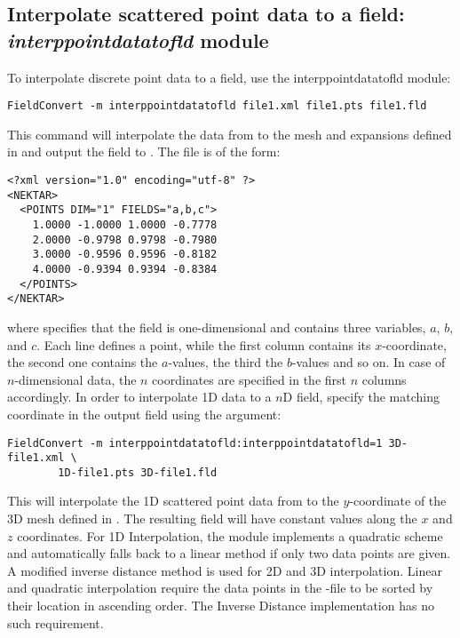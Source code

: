 \subsection{Interpolate scattered point data to a field: \textit{interppointdatatofld} module}
\label{s:utilities:fieldconvert:sub:interppointdatatofld}
To interpolate discrete point data to a field, use the interppointdatatofld module:
%
\begin{lstlisting}[style=BashInputStyle]
FieldConvert -m interppointdatatofld file1.xml file1.pts file1.fld
\end{lstlisting}
%
This command will interpolate the data from  to the mesh
and expansions defined in  and output the field to .
The file  is of the form:
%
\begin{lstlisting}[style=XMLStyle]
<?xml version="1.0" encoding="utf-8" ?>
<NEKTAR>
  <POINTS DIM="1" FIELDS="a,b,c">
    1.0000 -1.0000 1.0000 -0.7778
    2.0000 -0.9798 0.9798 -0.7980
    3.0000 -0.9596 0.9596 -0.8182
    4.0000 -0.9394 0.9394 -0.8384
  </POINTS>
</NEKTAR>
\end{lstlisting}
%
where  specifies that the field is one-dimensional
and contains three variables, $a$, $b$, and $c$.
Each line defines a point, while the  first column contains its $x$-coordinate,
the second one contains the $a$-values, the third the $b$-values and so on.
In case of $n$-dimensional data, the $n$ coordinates are specified in the first $n$
columns accordingly.
%
In order to interpolate 1D data to a $n$D field, specify the matching coordinate in
the output field using the  argument:
%
\begin{lstlisting}[style=BashInputStyle]
FieldConvert -m interppointdatatofld:interppointdatatofld=1 3D-file1.xml \
		1D-file1.pts 3D-file1.fld
\end{lstlisting}
%
This will interpolate the 1D scattered point data from  to the
$y$-coordinate of the 3D mesh defined in \inltt{3D-file1.xml}. The resulting field
will have constant values along the $x$ and $z$ coordinates.
For 1D Interpolation, the module implements a quadratic scheme and automatically 
falls back to a linear method if only two data points are given. 
A modified inverse distance method is used for 2D and 3D interpolation.
Linear and quadratic interpolation require the data points in the -file to be 
sorted by their location in ascending order. 
The Inverse Distance implementation has no such requirement.
%
%
%
